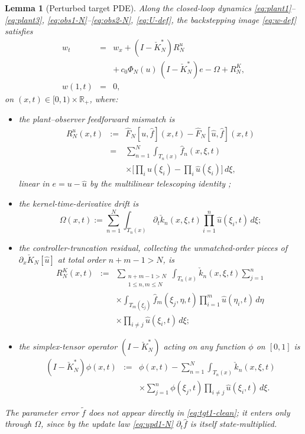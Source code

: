 \documentclass[journal,twoside,web]{ieeecolor}
\newtheorem{lemma}{Lemma}
\begin{document}
\begin{lemma}[Perturbed target PDE]\label{lem:target}
Along the closed-loop dynamics \eqref{eq:plant1}--\eqref{eq:plant3}, \eqref{eq:obs1-N}--\eqref{eq:obs2-N}, \eqref{eq:U-def}, the backstepping image \eqref{eq:w-def} satisfies
\begin{eqnarray}
w_t &=& w_x+(I-\check K_N^*)R^u_N \nonumber\\
&& +\,c_0\Phi_N(u)\,(I-\check K_N^*)e-\Omega+R^K_N, \label{eq:tgt1-clean}\\
w(1,t) &=& 0, \label{eq:tgt2-clean}
\end{eqnarray}
on $(x,t)\in[0,1)\times\mathbb{R}_+$, where:
\begin{itemize}
\item the \emph{plant--observer feedforward mismatch} is
\begin{eqnarray}
R^u_N(x,t) &:=& \hat F_N[u,\hat f](x,t)-\hat F_N[\hat u,\hat f](x,t) \nonumber\\
&=& \sum_{n=1}^N\int_{T_n(x)}\hat f_n(x,\xi,t) \nonumber\\
&& \times\bigl[\textstyle\prod_i u(\xi_i)-\prod_i\hat u(\xi_i)\bigr]\,d\xi, \label{eq:Ru-N-def}
\end{eqnarray}
linear in $e=u-\hat u$ by the multilinear telescoping identity \cite[eq.~(37)]{HV2};
\item the \emph{kernel-time-derivative drift} is
\begin{equation}\label{eq:Omega-def}
\Omega(x,t):=\sum_{n=1}^N\int_{T_n(x)}\partial_t\check k_n(x,\xi,t)\prod_{i=1}^n\hat u(\xi_i,t)\,d\xi;
\end{equation}
\item the \emph{controller-truncation residual}, collecting the unmatched-order pieces of $\partial_x \check K_N[\hat u]$ at total order $n+m-1>N$, is
\begin{eqnarray}
R^K_N(x,t) &:=& \sum_{\substack{n+m-1>N\\ 1\le n,m\le N}}\int_{T_n(x)}\check k_n(x,\xi,t)\sum_{j=1}^n \nonumber\\
&& \times\int_{T_m(\xi_j)}\!\hat f_m(\xi_j,\eta,t)\prod_{i=1}^m\!\hat u(\eta_i,t)\,d\eta \nonumber\\
&& \times\prod_{i\ne j}\!\hat u(\xi_i,t)\,d\xi; \label{eq:RKN-def}
\end{eqnarray}
\item the \emph{simplex-tensor operator} $(I-\check K_N^*)$ acting on any function $\phi$ on $[0,1]$ is
\begin{eqnarray}
(I-\check K_N^*)\phi(x,t) &:=& \phi(x,t)-\sum_{n=1}^N\int_{T_n(x)}\check k_n(x,\xi,t) \nonumber\\
&& \times\sum_{j=1}^n\phi(\xi_j,t)\!\prod_{i\ne j}\!\hat u(\xi_i,t)\,d\xi. \label{eq:KN-star-def}
\end{eqnarray}
\end{itemize}
The parameter error $\tilde f$ does not appear directly in \eqref{eq:tgt1-clean}; it enters only through $\Omega$, since by the update law \eqref{eq:upd1-N} $\partial_t\hat f$ is itself state-multiplied.
\end{lemma}
\end{document}
